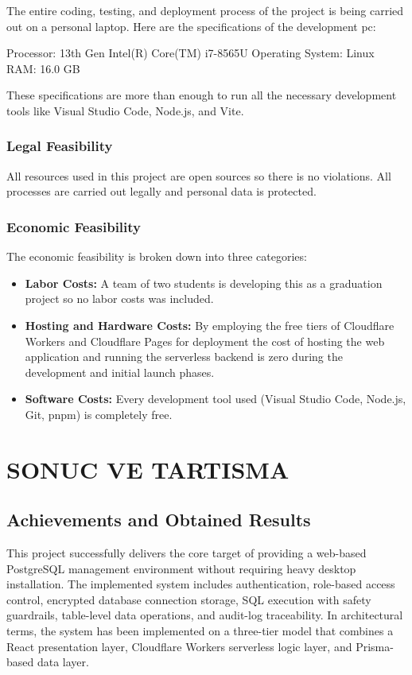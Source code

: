 The entire coding, testing, and deployment process of the project is being carried out on a personal laptop. Here are the specifications of the development pc:

Processor: 13th Gen Intel(R) Core(TM) i7-8565U 
Operating System: Linux
RAM: 16.0 GB

These specifications are more than enough to run all the necessary development tools like Visual Studio Code, Node.js, and Vite.


\subsection{Legal Feasibility}
All resources used in this project are open sources so there is no violations. All processes are carried out legally and personal data is protected.

\subsection{Economic Feasibility}
The economic feasibility is broken down into three categories:

\begin{itemize}
    \item \textbf{Labor Costs:} A team of two students is developing this as a graduation project so no labor costs was included.

    \item \textbf{Hosting and Hardware Costs:} By employing the free tiers of Cloudflare Workers and Cloudflare Pages for deployment the cost of hosting the web application and running the serverless backend is zero during the development and initial launch phases.

    \item \textbf{Software Costs:} 
    Every development tool used (Visual Studio Code, Node.js, Git, pnpm) is completely free.

    
\end{itemize}


\chapter{SONUC VE TARTISMA}

\section{Achievements and Obtained Results}

This project successfully delivers the core target of providing a web-based PostgreSQL management environment without requiring heavy desktop installation. The implemented system includes authentication, role-based access control, encrypted database connection storage, SQL execution with safety guardrails, table-level data operations, and audit-log traceability. In architectural terms, the system has been implemented on a three-tier model that combines a React presentation layer, Cloudflare Workers serverless logic layer, and Prisma-based data layer.

